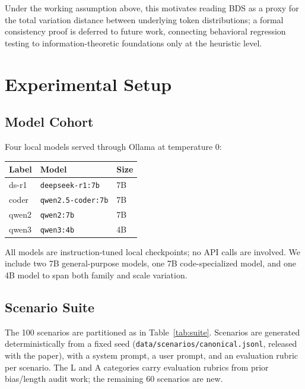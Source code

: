 \documentclass[11pt]{article}
\begin{document}
Under the working assumption above, this motivates reading BDS as a
proxy for the total variation distance between underlying token
distributions; a formal consistency proof is deferred to future work,
connecting behavioral regression testing to information-theoretic
foundations only at the heuristic level.

\section{Experimental Setup}
\label{sec:setup}

\subsection{Model Cohort}

Four local models served through Ollama at temperature 0:

\begin{center}
\begin{tabular}{@{}lll@{}}
\toprule
Label & Model & Size \\
\midrule
ds-r1  & \texttt{deepseek-r1:7b}  & 7B \\
coder  & \texttt{qwen2.5-coder:7b} & 7B \\
qwen2  & \texttt{qwen2:7b}        & 7B \\
qwen3  & \texttt{qwen3:4b}        & 4B \\
\bottomrule
\end{tabular}
\end{center}

All models are instruction-tuned local checkpoints; no API calls are
involved. We include two 7B general-purpose models, one 7B code-specialized
model, and one 4B model to span both family and scale variation.

\subsection{Scenario Suite}

The 100 scenarios are partitioned as in Table~\ref{tab:suite}. Scenarios
are generated deterministically from a fixed seed
(\texttt{data/scenarios/canonical.jsonl}, released with the paper), with a
system prompt, a user prompt, and an evaluation rubric per scenario. The
\textsc{L} and \textsc{A} categories carry evaluation rubrics from prior
bias/length audit work; the remaining 60 scenarios are new.
\end{document}
